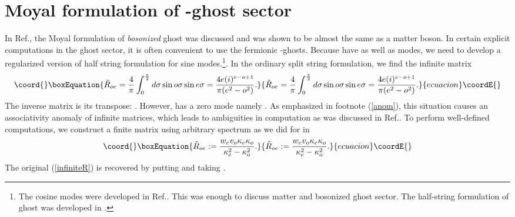 \documentclass[a4paper,11pt]{article}
\begin{document}
\section{Moyal formulation of \coordHE{}-ghost sector}

In Ref.\cite{BM2}, the Moyal formulation of \textit{bosonized} ghost was
discussed and was shown to be almost the same as a matter boson. In certain
explicit computations in the ghost sector, it is often convenient to use the
fermionic \coordHE{}-ghosts. Because \coordHE{} have \coordHE{}
as well as \coordHE{} modes, we need to develop a regularized version
of half string formulation for sine modes.\footnote{%
The cosine modes were developed in Ref.\cite{BM1}\cite{BM2}. This was enough
to discuss matter and bosonized ghost sector. The half-string formulation of
\coordHE{} ghost was developed in \cite{Bord}.}. In the ordinary split string
formulation, we find the infinite matrix
\begin{equation}\coord{}\boxEquation{
{\tilde{R}}_{oe}={\frac{4}{\pi }}\int_{0}^{\frac{\pi }{2}}d\sigma \sin
o\sigma \sin e\sigma ={\frac{4e(i)^{e-o+1}}{\pi (e^{2}-o^{2})}}.
\label{infiniteR}
}{
{\tilde{R}}_{oe}={\frac{4}{\pi }}\int_{0}^{\frac{\pi }{2}}d\sigma \sin
o\sigma \sin e\sigma ={\frac{4e(i)^{e-o+1}}{\pi (e^{2}-o^{2})}}.
}{ecuacion}\coordE{}\end{equation}%
The inverse matrix is its transpose: \coordHE{}. However, \coordHE{} has a zero mode \coordHE{} namely \coordHE{}. As emphasized in footnote (\ref{anom}), this situation causes an
associativity anomaly of infinite matrices, which leads to ambiguities in
computation as was discussed in Ref.\cite{BM1}. To perform well-defined
computations, we construct a finite \coordHE{} matrix \coordHE{} using
arbitrary spectrum \coordHE{} as we did for \coordHE{} in \cite%
{BM2}
\begin{equation}\coord{}\boxEquation{
{\tilde{R}}_{oe}:={\frac{w_{e}v_{o}\kappa _{e}\kappa _{o}}{\kappa
_{e}^{2}-\kappa _{o}^{2}}}.
}{
{\tilde{R}}_{oe}:={\frac{w_{e}v_{o}\kappa _{e}\kappa _{o}}{\kappa
_{e}^{2}-\kappa _{o}^{2}}}.
}{ecuacion}\coordE{}\end{equation}%
The original \coordHE{} (\ref{infiniteR}) is recovered by putting \coordHE{} and taking \coordHE{}.
\end{document}
